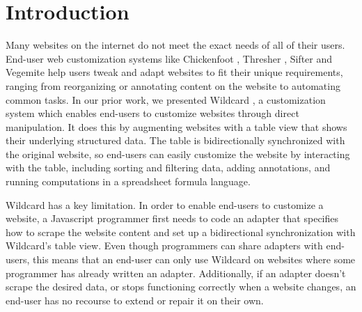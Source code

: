 \documentclass[sigconf,10pt]{acmart}
\begin{document}


\maketitle

\hypertarget{sec:introduction}{%
\section{Introduction}\label{sec:introduction}}

Many websites on the internet do not meet the exact needs of all of
their users. End-user web customization systems like Chickenfoot
\citep{bolin2005}, Thresher \citep{hogue2005}, Sifter \citep{huynh2006}
and Vegemite \citep{lin2009} help users tweak and adapt websites to fit
their unique requirements, ranging from reorganizing or annotating
content on the website to automating common tasks. In our prior work, we
presented Wildcard \citep{litt2020a}, a customization system which
enables end-users to customize websites through direct manipulation. It
does this by augmenting websites with a table view that shows their
underlying structured data. The table is bidirectionally synchronized
with the original website, so end-users can easily customize the website
by interacting with the table, including sorting and filtering data,
adding annotations, and running computations in a spreadsheet formula
language.

Wildcard has a key limitation. In order to enable end-users to customize
a website, a Javascript programmer first needs to code an adapter that
specifies how to scrape the website content and set up a bidirectional
synchronization with Wildcard's table view. Even though programmers can
share adapters with end-users, this means that an end-user can only use
Wildcard on websites where some programmer has already written an
adapter. Additionally, if an adapter doesn't scrape the desired data, or
stops functioning correctly when a website changes, an end-user has no
recourse to extend or repair it on their own.
\end{document}
